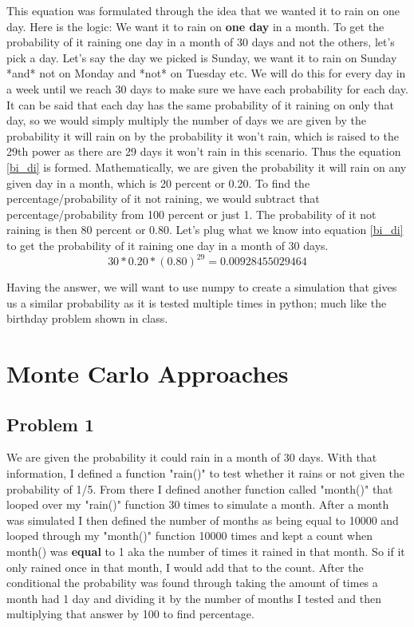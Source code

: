 \documentclass[twocolumn]{revtex4}
\begin{document}
This equation was formulated through the idea that we wanted it to rain on one day. Here is the logic: We want it to rain on \textbf{one day} in a month. To get the probability of it raining one day in a month of 30 days and not the others, let's pick a day. Let's say the day we picked is Sunday, we want it to rain on Sunday *and* not on Monday and *not* on Tuesday etc. We will do this for every day in a week until we reach 30 days to make sure we have each probability for each day. It can be said that each day has the same probability of it raining on only that day, so we would simply multiply the number of days we are given by the probability it will rain on by the probability it won't rain, which is raised to the 29th power as there are 29 days it won't rain in this scenario. Thus the equation \ref {bi_di} is formed. Mathematically, we are given the probability it will rain on any given day in a month, which is 20 percent or 0.20. To find the percentage/probability of it not raining, we would subtract that percentage/probability from 100 percent or just 1. The probability of it not raining is then 80 percent or 0.80. Let's plug what we know into equation \ref{bi_di} to get the probability of it raining one day in a month of 30 days. \begin{equation} 30 * 0.20 * (0.80)^{29} = 0.00928455029464 \end{equation}

Having the answer, we will want to use numpy to create a simulation that gives us a similar probability as it is tested multiple times in python; much like the birthday problem shown in class.

\section{Monte Carlo Approaches}

\subsection{Problem 1}
We are given the probability it could rain in a month of 30 days. With that information, I defined a function "rain()" to test whether it rains or not given the probability of 1/5. From there I defined another function called "month()" that looped over my "rain()" function 30 times to simulate a month. After a month was simulated I then defined the number of months as being equal to 10000 and looped through my "month()" function 10000 times and kept a count when month() was \textbf{equal} to 1 aka the number of times it rained in that month. So if it only rained once in that month, I would add that to the count. After the conditional the probability was found through taking the amount of times a month had 1 day and dividing it by the number of months I tested and then multiplying that answer by 100 to find percentage.
\end{document}
